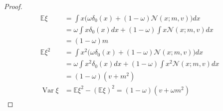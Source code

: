 \documentclass{article}
\begin{document}
\begin{proof}
\begin{align*}
\begin{split}
\mathbb{E}\xi &= \int x \big(\omega \delta_0(x) + (1 - \omega)\mathcal{N}(x; m, v)\big)dx \\
& = \omega \int x \delta_0(x)dx + (1 - \omega)\int x \mathcal{N}(x; m, v)dx \\
& = (1-\omega)m \\
\mathbb{E}\xi^2 &= \int x^2 \big(\omega \delta_0(x) + (1 - \omega)\mathcal{N}(x; m, v)\big)dx \\
& = \omega \int x^2 \delta_0(x)dx + (1 - \omega)\int x^2 \mathcal{N}(x; m, v)dx \\
& = (1-\omega)(v + m^2) \\
\operatorname{Var}\xi &= \mathbb{E}\xi^2 - \left(\mathbb{E}\xi\right)^2 = (1-\omega)(v + \omega m^2)
\end{split}
\end{align*}
\end{proof}
\end{document}
